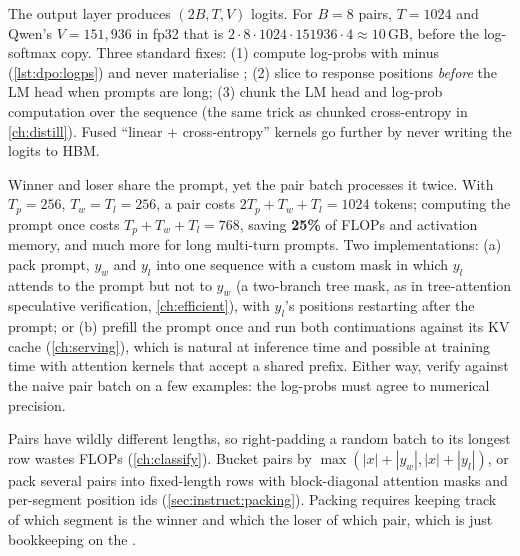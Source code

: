 \begin{systemslens}
The output layer produces $(2B,T,V)$ logits. For $B=8$ pairs, $T=1024$ and Qwen's $V=151{,}936$
in fp32 that is $2\cdot8\cdot1024\cdot151936\cdot4\approx10$\,GB, before the log-softmax copy.
Three standard fixes: (1) compute log-probs with  minus 
(\cref{lst:dpo:logps}) and never materialise ; (2) slice to response positions
\emph{before} the LM head when prompts are long; (3) chunk the LM head and log-prob computation
over the sequence (the same trick as chunked cross-entropy in \cref{ch:distill}). Fused
``linear + cross-entropy'' kernels go further by never writing the logits to HBM.
\end{systemslens}

\begin{systemslens}
Winner and loser share the prompt, yet the pair batch processes it twice. With $T_p=256$,
$T_w=T_l=256$, a pair costs $2T_p+T_w+T_l=1024$ tokens; computing the prompt once costs
$T_p+T_w+T_l=768$, saving \textbf{25\%} of FLOPs and activation memory, and much more for long
multi-turn prompts. Two implementations: (a) pack prompt, $y_w$ and $y_l$ into one sequence with a
custom mask in which $y_l$ attends to the prompt but not to $y_w$ (a two-branch tree mask, as in
tree-attention speculative verification, \cref{ch:efficient}), with $y_l$'s positions restarting
after the prompt; or (b) prefill the prompt once and run both continuations against its KV cache
(\cref{ch:serving}), which is natural at inference time and possible at training time with
attention kernels that accept a shared prefix. Either way, verify against the naive pair batch on
a few examples: the log-probs must agree to numerical precision.
\end{systemslens}

\begin{deepdive}
Pairs have wildly different lengths, so right-padding a random batch to its longest row wastes
FLOPs (\cref{ch:classify}). Bucket pairs by $\max(|x|+|y_w|,|x|+|y_l|)$, or pack several pairs into
fixed-length rows with block-diagonal attention masks and per-segment position ids
(\cref{sec:instruct:packing}). Packing requires keeping track of which segment is the winner and
which the loser of which pair, which is just bookkeeping on the .
\end{deepdive}

